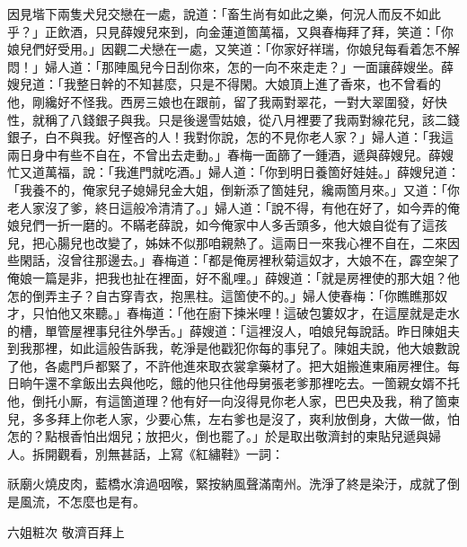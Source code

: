 因見堦下兩隻犬兒交戀在一處，說道：「畜生尚有如此之樂，何況人而反不如此乎？」正飲酒，只見薛嫂兒來到，向金蓮道箇萬福，又與春梅拜了拜，笑道：「你娘兒們好受用。」因觀二犬戀在一處，又笑道：「你家好祥瑞，你娘兒每看着怎不解悶！」婦人道：「那陣風兒今日刮你來，怎的一向不來走走？」一面讓薛嫂坐。薛嫂兒道：「我整日幹的不知甚麼，只是不得閑。大娘頂上進了香來，也不曾看的他，剛纔好不怪我。西房三娘也在跟前，留了我兩對翠花，一對大翠圍發，好快性，就稱了八錢銀子與我。只是後邊雪姑娘，從八月裡要了我兩對線花兒，該二錢銀子，白不與我。好慳吝的人！{}我對你說，怎的不見你老人家？」婦人道：「我這兩日身中有些不自在，不曾出去走動。」春梅一面篩了一鍾酒，遞與薛嫂兒。薛嫂忙又道萬福，說：「我進門就吃酒。」婦人道：「你到明日養箇好娃娃。」薛嫂兒道：「我養不的，俺家兒子媳婦兒金大姐，倒新添了箇娃兒，纔兩箇月來。」{}又道：「你老人家沒了爹，終日這般冷清清了。」婦人道：「說不得，有他在好了，如今弄的俺娘兒們一折一磨的。不瞞老薛說，如今俺家中人多舌頭多，他大娘自從有了這孩兒，把心腸兒也改變了，姊妹不似那咱親熱了。這兩日一來我心裡不自在，二來因些閑話，沒曾往那邊去。」春梅道：「都是俺房裡秋菊這奴才，大娘不在，霹空架了俺娘一篇是非，把我也扯在裡面，好不亂哩。」{}薛嫂道：「就是房裡使的那大姐？他怎的倒弄主子？自古穿青衣，抱黑柱。這箇使不的。」婦人使春梅：「你瞧瞧那奴才，只怕他又來聽。」{}春梅道：「他在廚下揀米哩！這破包簍奴才，在這屋就是走水的槽，單管屋裡事兒往外學舌。」薛嫂道：「這裡沒人，咱娘兒每說話。昨日陳姐夫到我那裡，如此這般告訴我，乾淨是他戳犯你每的事兒了。陳姐夫說，他大娘數說了他，各處門戶都緊了，不許他進來取衣裳拿藥材了。把大姐搬進東廂房裡住。每日晌午還不拿飯出去與他吃，餓的他只往他母舅張老爹那裡吃去。一箇親女婿不托他，倒托小厮，有這箇道理？他有好一向沒得見你老人家，巴巴央及我，稍了箇柬兒，多多拜上你老人家，少要心焦，左右爹也是沒了，爽利放倒身，大做一做，怕怎的？{}點根香怕出烟兒；放把火，倒也罷了。」於是取出敬濟封的柬貼兒遞與婦人。拆開觀看，別無甚話，上寫《紅繡鞋》一詞：

\begin{myquote}
祅廟火燒皮肉，藍橋水渰過咽喉，緊按納風聲滿南州。洗淨了終是染汙，成就了倒是風流，不怎麼也是有。{}

六姐粧次 敬濟百拜上
\end{myquote}

